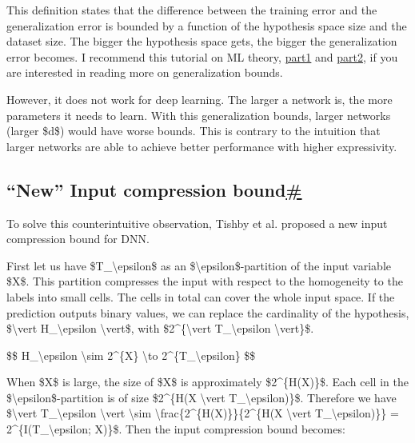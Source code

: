 This definition states that the difference between the training error and the generalization error is bounded by a function of the hypothesis space size and the dataset size. The bigger the hypothesis space gets, the bigger the generalization error becomes. I recommend this tutorial on ML theory, \href{https://mostafa-samir.github.io/ml-theory-pt1/}{part1} and \href{https://mostafa-samir.github.io/ml-theory-pt2/}{part2}, if you are interested in reading more on generalization bounds.

However, it does not work for deep learning. The larger a network is, the more parameters it needs to learn. With this generalization bounds, larger networks (larger \$d\$) would have worse bounds. This is contrary to the intuition that larger networks are able to achieve better performance with higher expressivity.

\subsection{\texorpdfstring{``New'' Input compression bound\hyperref[new-input-compression-bound]{\#}}{``New'' Input compression bound\#}}\label{new-input-compression-bound}

To solve this counterintuitive observation, Tishby et al. proposed a new input compression bound for DNN.

First let us have \$T\_\textbackslash epsilon\$ as an \$\textbackslash epsilon\$-partition of the input variable \$X\$. This partition compresses the input with respect to the homogeneity to the labels into small cells. The cells in total can cover the whole input space. If the prediction outputs binary values, we can replace the cardinality of the hypothesis, \$\textbackslash vert H\_\textbackslash epsilon \textbackslash vert\$, with \$2\^{}\{\textbackslash vert T\_\textbackslash epsilon \textbackslash vert\}\$.

\$\$ \textbar H\_\textbackslash epsilon\textbar{} \textbackslash sim 2\^{}\{\textbar X\textbar\} \textbackslash to 2\^{}\{\textbar T\_\textbackslash epsilon\textbar\} \$\$

When \$X\$ is large, the size of \$X\$ is approximately \$2\^{}\{H(X)\}\$. Each cell in the \$\textbackslash epsilon\$-partition is of size \$2\^{}\{H(X \textbackslash vert T\_\textbackslash epsilon)\}\$. Therefore we have \$\textbackslash vert T\_\textbackslash epsilon \textbackslash vert \textbackslash sim \textbackslash frac\{2\^{}\{H(X)\}\}\{2\^{}\{H(X \textbackslash vert T\_\textbackslash epsilon)\}\} = 2\^{}\{I(T\_\textbackslash epsilon; X)\}\$. Then the input compression bound becomes:

